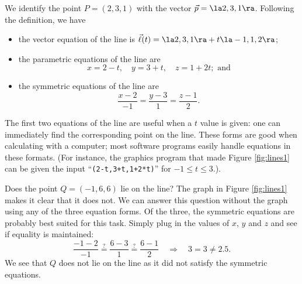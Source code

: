 {We identify the point $P=(2,3,1)$ with the vector $\vec p =\la 2,3,1\ra$. Following the definition, we have
\begin{itemize}
	\item the vector equation of the line is $\vec\ell(t) = \la 2,3,1\ra + t\la -1,1,2\ra$;
	\item	the parametric equations of the line are
	$$x = 2-t,\quad y = 3+t,\quad z = 1+2t; \text{ and}$$
	\item	the symmetric equations of the line are
	$$\frac{x-2}{-1}=\frac{y-3}{1} = \frac{z-1}{2}.$$
\end{itemize}

The first two equations of the line are useful when a $t$ value is given: one can immediately find the corresponding point on the line. These forms are good when calculating with a computer; most software programs easily handle equations in these formats. (For instance, the graphics program that made Figure \ref{fig:lines1} can be given the input ``\texttt{(2-t,3+t,1+2*t)}'' for $-1\leq t\leq 3$.).

Does the point $Q = (-1,6,6)$ lie on the line? The graph in Figure \ref{fig:lines1} makes it clear that it does not. We can answer this question without the graph using any of the three equation forms. Of the three, the symmetric equations are probably best suited for this task. Simply plug in the values of $x$, $y$ and $z$ and see if equality is maintained:
$$ \frac{-1-2}{-1} \stackrel{?}{=} \frac{6-3}{1} \stackrel{?}{=} \frac{6-1}{2} \quad \Rightarrow \quad 3=3\neq2.5.$$
We see that $Q$ does not lie on the line as it did not satisfy the symmetric equations.
}\\

